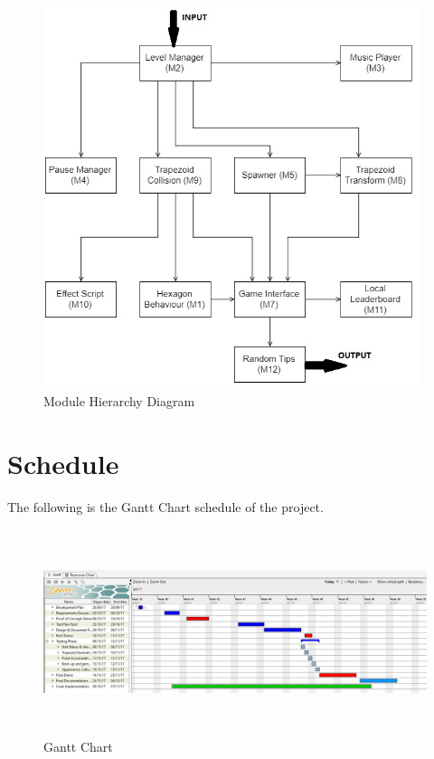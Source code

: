 \documentclass[12pt, titlepage]{article}
\begin{document}
\begin{figure}[h!]
\centering
\includegraphics[width = 11cm]{ModuleHierarchyDiag}
\caption{Module Hierarchy Diagram}
\end{figure}

\newpage
\section{Schedule}
\noindent The following is the Gantt Chart schedule of the project.
\begin{figure}[H]
\centering
\includegraphics[width = 14cm, height = 6cm]{GanttChart}
\caption{Gantt Chart}
\end{figure}
\end{document}
